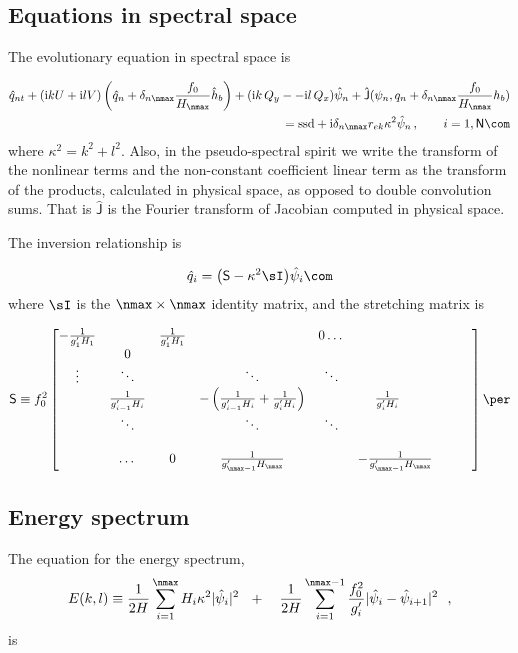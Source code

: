 \documentclass[11pt]{article}
\newcommand{\ssd}{\text{ssd}}
\newcommand{\sS}{\mathsf{S}}
\begin{document}
\subsection*{Equations in spectral space}

The evolutionary equation in spectral space is

\begin{align}
    \hat{q}_{nt} + (\mathrm{i} k U + \mathrm{i} l V) \left(\hat{q}_n + \delta_{n \nmax} \frac{f_0}{H_\nmax}\hat{h}_b\right) + (\mathrm{i} k\, {Q_y} -  - \mathrm{i} l\,{Q_x}){\hat{\psi}_n} + \mathsf{\hat{J}}(\psi_n, q_n + \delta_{n \nmax} \frac{f_0}{H_\nmax}h_b )   \nonumber \\ =  \ssd + \mathrm{i}  \delta_{n \nmax} r_{ek} \kappa^2 \hat{\psi}_n \,, \qquad i = 1,\textsf{N}\com
\end{align}
where $\kappa^2 = k^2 + l^2$. Also, in the pseudo-spectral spirit we write the transform of the nonlinear
terms and the non-constant coefficient linear term as the transform of the products, calculated in physical space, as opposed to double convolution sums.  That is $\mathsf{\hat{J}}$ is the Fourier transform of Jacobian computed in physical space.

The inversion relationship is

\begin{equation}
    \hat{q}_i = {\left(\sS - \kappa^2 \sI \right)} \hat{\psi}_i\com
\end{equation}
where $\sI$ is the $\nmax\times\nmax$ identity matrix, and the stretching matrix is

\begin{equation}
\textsf{S} \equiv  f_0^2
\begin{bmatrix}
    -\frac{1}{g'_1 H_1}& & \frac{1}{g'_1 H_1} &  & 0 \dots& \\
 & 0 & & & & &\\
    \vdots & \ddots& &\ddots &\ddots & & & &\\
       & \frac{1}{g'_{i-1} H_i}& &  -\left(\frac{1}{g'_{i-1} H_i} + \frac{1}{g'_{i} H_i}\right)& & \frac{1}{g'_{i} H_i}\,\,\,\,\,\,\, \\
       & \ddots& & \ddots &\ddots & & & &\\
& & & & & \\
& \dots & 0 & \frac{1}{ g'_{\nmax-1} H_\nmax}& & -\frac{1}{g'_{\nmax-1} H_\nmax}
\end{bmatrix}
\per
\end{equation}

\subsection*{Energy spectrum}
The equation for the energy spectrum,
\begin{equation}
E(k,l) \equiv {\frac{1}{2 H}\sum_{i=1}^{\nmax} H_i \kappa^2 |\hat{\psi}_i|^2} \,\,\,\,+ \,\,\,\,\,\, {\frac{1}{2 H} \sum_{i=1}^{\nmax-1} \frac{f_0^2}{g'_i}|\hat{\psi}_{i}- \hat{\psi}_{i+1}|^2}\,\,\,\,,
\end{equation}
is 
\end{document}
